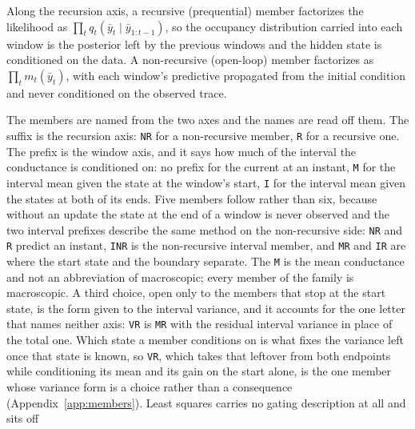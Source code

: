 Along the recursion axis, a recursive (prequential) member factorizes the likelihood as
$\prod_t q_t(\bar{y}_t \mid \bar{y}_{1:t-1})$, so the occupancy distribution carried into
each window is the posterior left by the previous windows and the hidden state is
conditioned on the data. A non-recursive (open-loop) member factorizes as
$\prod_t m_t(\bar{y}_t)$, with each window's predictive propagated from the initial
condition and never conditioned on the observed trace.

The members are named from the two axes and the names are read off them. The suffix is the
recursion axis: \texttt{NR} for a non-recursive member, \texttt{R} for a recursive one. The
prefix is the window axis, and it says how much of the interval the conductance is
conditioned on: no prefix for the current at an instant, \texttt{M} for the interval mean
given the state at the window's start, \texttt{I} for the interval mean given the states at
both of its ends. Five members follow rather than six, because without an update the state
at the end of a window is never observed and the two interval prefixes describe the same
method on the non-recursive side: \texttt{NR} and \texttt{R} predict an instant, \texttt{INR}
is the non-recursive interval member, and \texttt{MR} and \texttt{IR} are where the start
state and the boundary separate. The \texttt{M} is the mean conductance and not an
abbreviation of macroscopic; every member of the family is macroscopic. A third choice, open
only to the members that stop at the start state, is the form given to the interval variance,
and it accounts for the one letter that names neither axis: \texttt{VR} is \texttt{MR} with
the residual interval variance in place of the total one. Which state a member conditions on
is what fixes the variance left once that state is known, so \texttt{VR}, which takes that
leftover from both endpoints while conditioning its mean and its gain on the start alone, is
the one member whose variance form is a choice rather than a consequence
(Appendix~\ref{app:members}). Least squares carries no gating description at all and sits off
